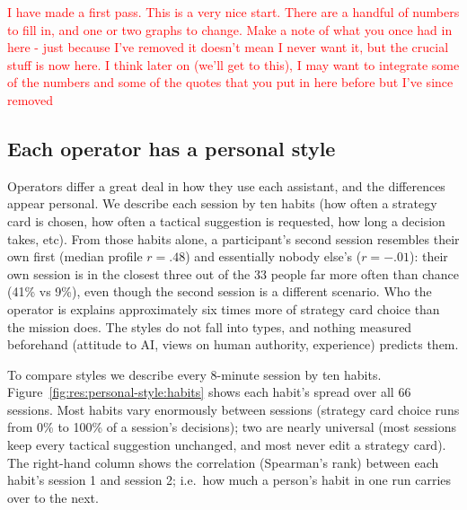 

\textcolor{red}{I have made a first pass. This is a very nice start. There are a handful of numbers to fill in, and one or two graphs to change. Make a note of what you once had in here - just because I've removed it doesn't mean I never want it, but the crucial stuff is now here. I think later on (we'll get to this), I may want to integrate some of the numbers and some of the quotes that you put in here before but I've since removed}

\subsection{Each operator has a personal style}\label{sec:res:personal-style}

Operators differ a great deal in how they use each assistant, and the differences appear personal. We describe each session by ten habits (how often a strategy card is chosen, how often a tactical suggestion is requested, how long a decision takes, etc). From those habits alone, a participant's second session resembles their own first (median profile $r = .48$) and essentially nobody else's ($r = -.01$): their own session is in the closest three out of the 33 people far more often than chance (41\% vs 9\%), even though the second session is a different scenario. Who the operator is explains approximately six times more of strategy card choice than the mission does. The styles do not fall into types, and nothing measured beforehand (attitude to AI, views on human authority, experience) predicts them.


\label{sec:res:personal-style:habits}
To compare styles we describe every 8-minute session by ten habits. Figure~\ref{fig:res:personal-style:habits} shows each habit's spread over all 66 sessions. Most habits vary enormously between sessions (strategy card choice runs from 0\% to 100\% of a session's decisions); two are nearly universal (most sessions keep every tactical suggestion unchanged, and most never edit a strategy card). The right-hand column shows the correlation (Spearman's rank) between each habit's session 1 and session 2; i.e.\ how much a person's habit in one run carries over to the next.

